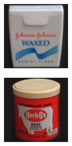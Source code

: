 \begin{figure}[htbp]
\begin{subfigure}{80pt}
    \caption{}
	\end{subfigure}
	\begin{subfigure}{80pt}
        \centering
    \includegraphics[width=\textwidth]{figures/coil_original/65.png}
    \caption{}
	\end{subfigure}
	\begin{subfigure}{80pt}
        \centering
    \includegraphics[width=\textwidth]{figures/coil_original/71.png}

\end{subfigure}
\end{figure}
